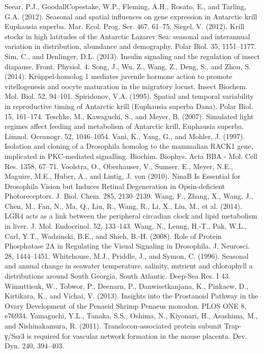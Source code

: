 Seear, P.J., GoodallCopestake, W.P., Fleming, A.H., Rosato, E., and Tarling, G.A. (2012). Seasonal and spatial influences on gene expression in Antarctic krill Euphausia superba. Mar. Ecol. Prog. Ser. 467, 61–75.
Siegel, V. (2012). Krill stocks in high latitudes of the Antarctic Lazarev Sea: seasonal and interannual variation in distribution, abundance and demography. Polar Biol. 35, 1151–1177.
Sim, C., and Denlinger, D.L. (2013). Insulin signaling and the regulation of insect diapause. Front. Physiol. 4.
Song, J., Wu, Z., Wang, Z., Deng, S., and Zhou, S. (2014). Krüppel-homolog 1 mediates juvenile hormone action to promote vitellogenesis and oocyte maturation in the migratory locust. Insect Biochem. Mol. Biol. 52, 94–101.
Spiridonov, V.A. (1995). Spatial and temporal variability in reproductive timing of Antarctic krill (Euphausia superba Dana). Polar Biol. 15, 161–174.
Teschke, M., Kawaguchi, S., and Meyer, B. (2007). Simulated light regimes affect feeding and metabolism of Antarctic krill, Euphausia superba. Limnol. Oceanogr. 52, 1046–1054.
Vani, K., Yang, G., and Mohler, J. (1997). Isolation and cloning of a Drosophila homolog to the mammalian RACK1 gene, implicated in PKC-mediated signalling. Biochim. Biophys. Acta BBA - Mol. Cell Res. 1358, 67–71.
Voolstra, O., Oberhauser, V., Sumser, E., Meyer, N.E., Maguire, M.E., Huber, A., and Lintig, J. von (2010). NinaB Is Essential for Drosophila Vision but Induces Retinal Degeneration in Opsin-deficient Photoreceptors. J. Biol. Chem. 285, 2130–2139.
Wang, F., Zhang, X., Wang, J., Chen, M., Fan, N., Ma, Q., Liu, R., Wang, R., Li, X., Liu, M., et al. (2014). LGR4 acts as a link between the peripheral circadian clock and lipid metabolism in liver. J. Mol. Endocrinol. 52, 133–143.
Wang, N., Leung, H.-T., Pak, W.L., Carl, Y.T., Wadzinski, B.E., and Shieh, B.-H. (2008). Role of Protein Phosphatase 2A in Regulating the Visual Signaling in Drosophila. J. Neurosci. 28, 1444–1451.
Whitehouse, M.J., Priddle, J., and Symon, C. (1996). Seasonal and annual change in seawater temperature, salinity, nutrient and chlorophyll a distributions around South Georgia, South Atlantic. Deep-Sea Res. I 43.
Wimuttisuk, W., Tobwor, P., Deenarn, P., Danwisetkanjana, K., Pinkaew, D., Kirtikara, K., and Vichai, V. (2013). Insights into the Prostanoid Pathway in the Ovary Development of the Penaeid Shrimp Penaeus monodon. PLOS ONE 8, e76934.
Yamaguchi, Y.L., Tanaka, S.S., Oshima, N., Kiyonari, H., Asashima, M., and Nishinakamura, R. (2011). Translocon-associated protein subunit Trap-γ/Ssr3 is required for vascular network formation in the mouse placenta. Dev. Dyn. 240, 394–403.
